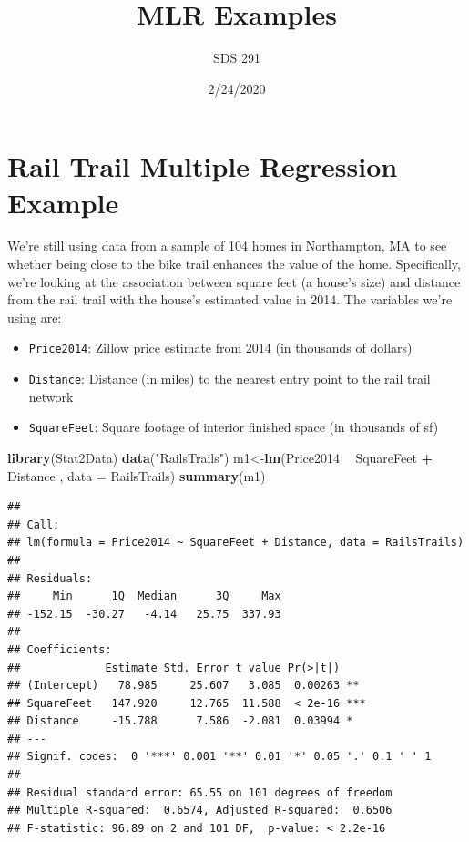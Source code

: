 \documentclass[]{article}
\title{MLR Examples}
\author{SDS 291}
\date{2/24/2020}
\newenvironment{Shaded}{\begin{snugshade}}{\end{snugshade}}
\newcommand{\DataTypeTok}[1]{\textcolor[rgb]{0.13,0.29,0.53}{#1}}
\newcommand{\KeywordTok}[1]{\textcolor[rgb]{0.13,0.29,0.53}{\textbf{#1}}}
\newcommand{\NormalTok}[1]{#1}
\newcommand{\OperatorTok}[1]{\textcolor[rgb]{0.81,0.36,0.00}{\textbf{#1}}}
\newcommand{\StringTok}[1]{\textcolor[rgb]{0.31,0.60,0.02}{#1}}
\providecommand{\tightlist}{%
  \setlength{\itemsep}{0pt}\setlength{\parskip}{0pt}}
\begin{document}
\maketitle

\hypertarget{rail-trail-multiple-regression-example}{%
\section{Rail Trail Multiple Regression
Example}\label{rail-trail-multiple-regression-example}}

We're still using data from a sample of 104 homes in Northampton, MA to
see whether being close to the bike trail enhances the value of the
home. Specifically, we're looking at the association between square feet
(a house's size) and distance from the rail trail with the house's
estimated value in 2014. The variables we're using are:

\begin{itemize}
\tightlist
\item
  \texttt{Price2014}: Zillow price estimate from 2014 (in thousands of
  dollars)
\item
  \texttt{Distance}: Distance (in miles) to the nearest entry point to
  the rail trail network
\item
  \texttt{SquareFeet}: Square footage of interior finished space (in
  thousands of sf)
\end{itemize}

\begin{Shaded}
\begin{Highlighting}[]
\KeywordTok{library}\NormalTok{(Stat2Data)}
\KeywordTok{data}\NormalTok{(}\StringTok{"RailsTrails"}\NormalTok{)}
\NormalTok{m1<-}\KeywordTok{lm}\NormalTok{(Price2014 }\OperatorTok{~}\StringTok{ }\NormalTok{SquareFeet }\OperatorTok{+}\StringTok{ }\NormalTok{Distance , }\DataTypeTok{data =}\NormalTok{ RailsTrails)}
\KeywordTok{summary}\NormalTok{(m1)}
\end{Highlighting}
\end{Shaded}

\begin{verbatim}
## 
## Call:
## lm(formula = Price2014 ~ SquareFeet + Distance, data = RailsTrails)
## 
## Residuals:
##     Min      1Q  Median      3Q     Max 
## -152.15  -30.27   -4.14   25.75  337.93 
## 
## Coefficients:
##             Estimate Std. Error t value Pr(>|t|)    
## (Intercept)   78.985     25.607   3.085  0.00263 ** 
## SquareFeet   147.920     12.765  11.588  < 2e-16 ***
## Distance     -15.788      7.586  -2.081  0.03994 *  
## ---
## Signif. codes:  0 '***' 0.001 '**' 0.01 '*' 0.05 '.' 0.1 ' ' 1
## 
## Residual standard error: 65.55 on 101 degrees of freedom
## Multiple R-squared:  0.6574, Adjusted R-squared:  0.6506 
## F-statistic: 96.89 on 2 and 101 DF,  p-value: < 2.2e-16
\end{verbatim}
\end{document}
